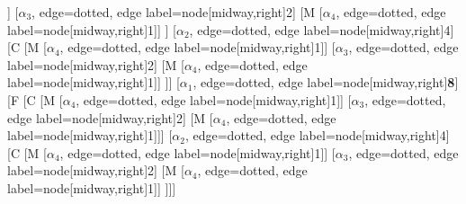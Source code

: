 \begin{forest}
[B
	[F
		[C
			[M
				[$\alpha_{4}$, edge=dotted, edge label={node[midway,right]{1}}]]
			[$\alpha_{3}$, edge=dotted, edge label={node[midway,right]{2}}]
			[M
				[$\alpha_{4}$, edge=dotted, edge label={node[midway,right]{1}}]]
		]
		[$\alpha_{2}$, edge=dotted, edge label={node[midway,right]{4}}]
		[C
			[M
				[$\alpha_{4}$, edge=dotted, edge label={node[midway,right]{1}}]]
			[$\alpha_{3}$, edge=dotted, edge label={node[midway,right]{2}}]
			[M
				[$\alpha_{4}$, edge=dotted, edge label={node[midway,right]{1}}]]
		]]
	[$\alpha_{1}$, edge=dotted, edge label={node[midway,right]{\textbf{8}}}]
	[F
		[C
			[M
				[$\alpha_{4}$, edge=dotted, edge label={node[midway,right]{1}}]]
			[$\alpha_{3}$, edge=dotted, edge label={node[midway,right]{2}}]
			[M
				[$\alpha_{4}$, edge=dotted, edge label={node[midway,right]{1}}]]]
		[$\alpha_{2}$, edge=dotted, edge label={node[midway,right]{4}}]
		[C
			[M
				[$\alpha_{4}$, edge=dotted, edge label={node[midway,right]{1}}]]
			[$\alpha_{3}$, edge=dotted, edge label={node[midway,right]{2}}]
			[M
				[$\alpha_{4}$, edge=dotted, edge label={node[midway,right]{1}}]]
	]]]
\end{forest}
